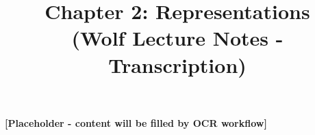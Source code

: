\documentclass{article}
\title{Chapter 2: Representations \\ {\small (Wolf Lecture Notes - Transcription)}}
\date{}
\begin{document}
\maketitle
\tableofcontents

\textbf{[Placeholder - content will be filled by OCR workflow]}
\end{document}
